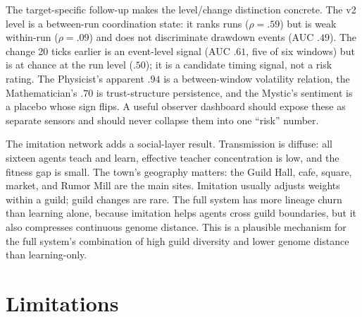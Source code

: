 \documentclass[11pt]{article}
\begin{document}
The target-specific follow-up makes the level/change distinction concrete. The v2
level is a between-run coordination state: it ranks runs ($\rho=.59$) but is weak
within-run ($\rho=.09$) and does not discriminate drawdown events (AUC $.49$).
The change 20 ticks earlier is an event-level signal (AUC $.61$, five of six
windows) but is at chance at the run level ($.50$); it is a candidate timing
signal, not a risk rating. The Physicist's apparent $.94$ is a between-window
volatility relation, the Mathematician's $.70$ is trust-structure persistence,
and the Mystic's sentiment is a placebo whose sign flips. A useful observer
dashboard should expose these as separate sensors and should never collapse them
into one ``risk'' number.

The imitation network adds a social-layer result. Transmission is diffuse: all
sixteen agents teach and learn, effective teacher concentration is low, and the
fitness gap is small. The town's geography matters: the Guild Hall, cafe, square,
market, and Rumor Mill are the main sites. Imitation usually adjusts weights
within a guild; guild changes are rare. The full system has more lineage churn
than learning alone, because imitation helps agents cross guild boundaries, but
it also compresses continuous genome distance. This is a plausible mechanism for
the full system's combination of high guild diversity and lower genome distance
than learning-only.

\section{Limitations}
\end{document}
